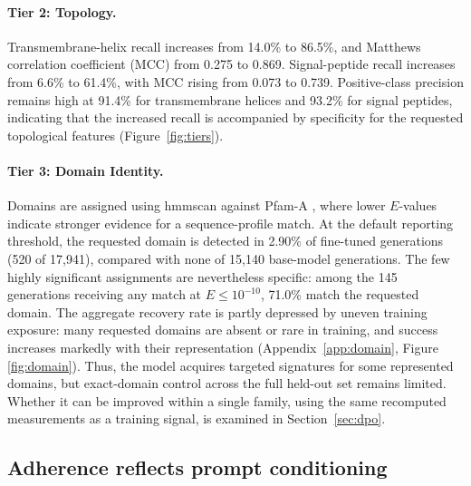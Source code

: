 \documentclass{article} %
\newcommand{\pct}{\%}
\begin{document}
\paragraph{Tier 2: Topology.}
Transmembrane-helix recall increases from 14.0\pct{} to 86.5\pct{}, and Matthews correlation coefficient (MCC) from 0.275 to 0.869. Signal-peptide recall increases from 6.6\pct{} to 61.4\pct{}, with MCC rising from 0.073 to 0.739. Positive-class precision remains high at 91.4\pct{} for transmembrane helices and 93.2\pct{} for signal peptides, indicating that the increased recall is accompanied by specificity for the requested topological features (Figure~\ref{fig:tiers}).

\paragraph{Tier 3: Domain Identity.}
Domains are assigned using hmmscan
\citep{eddy2011hmmer} against Pfam-A \citep{mistry2021pfam}, where lower $E$-values indicate stronger evidence for a sequence-profile match. At the default reporting threshold, the requested domain is detected in 2.90\% of fine-tuned generations (520 of 17{,}941), compared with none of 15{,}140 base-model generations. The few highly significant assignments are nevertheless specific: among the 145 generations receiving any match at $E\leq10^{-10}$, 71.0\% match the requested domain. The aggregate recovery rate is partly depressed by uneven training exposure: many requested domains are absent or rare in training, and success increases markedly with their representation (Appendix~\ref{app:domain}, Figure \ref{fig:domain}). Thus, the model acquires targeted signatures for some represented domains, but exact-domain control across the full held-out set remains limited. Whether it can be improved within a single family, using the same recomputed measurements as a training signal, is examined in Section~\ref{sec:dpo}.


\subsection{Adherence reflects prompt conditioning}
\end{document}
